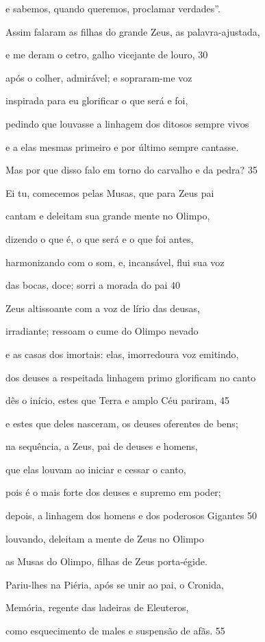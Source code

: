 e sabemos, quando queremos, proclamar verdades''.

Assim falaram as filhas do grande Zeus, as palavra-ajustada,

e me deram o cetro, galho vicejante de louro, \num{30}

após o colher, admirável; e sopraram-me voz

inspirada para eu glorificar o que será e foi,

pedindo que louvasse a linhagem dos ditosos sempre vivos

e a elas mesmas primeiro e por último sempre cantasse.

\quad{}Mas por que disso falo em torno do carvalho e da pedra? \num{35}

Ei tu, comecemos pelas Musas, que para Zeus pai

cantam e deleitam sua grande mente no Olimpo,

dizendo o que é, o que será e o que foi antes,

harmonizando com o som, e, incansável, flui sua voz

das bocas, doce; sorri a morada do pai \num{40}

Zeus altissoante com a voz de lírio das deusas,

irradiante; ressoam o cume do Olimpo nevado

e as casas dos imortais: elas, imorredoura voz emitindo,

dos deuses a respeitada linhagem primo glorificam no canto

dês o início, estes que Terra e amplo Céu pariram, \num{45}

e estes que deles nasceram, os deuses oferentes de bens;

na sequência, a Zeus, pai de deuses e homens,

que elas louvam ao iniciar e cessar o canto,

pois é o mais forte dos deuses e supremo em poder;

depois, a linhagem dos homens e dos poderosos Gigantes \num{50}

louvando, deleitam a mente de Zeus no Olimpo

as Musas do Olimpo, filhas de Zeus porta-égide.

\quad{}Pariu-lhes na Piéria, após se unir ao pai, o Cronida,

Memória, regente das ladeiras de Eleuteros,

como esquecimento de males e suspensão de afãs. \num{55}

